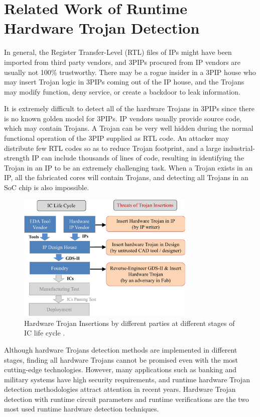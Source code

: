 \documentclass[10pt,journal]{IEEEtran}
\begin{document}
\section{Related Work of Runtime Hardware Trojan Detection}

In general, the Register Transfer-Level (RTL) files of IPs might have been imported from third party vendors, and 3PIPs procured from IP vendors are usually not 100\% trustworthy. There may be a rogue insider in a 3PIP house who may insert Trojan logic in 3PIPs coming out of the IP house, and the Trojans may modify function, deny service, or create a backdoor to leak information.%

It is extremely difficult to detect all of the hardware Trojans in 3PIPs since there is no known golden model for 3PIPs. IP vendors usually provide source code, which may contain Trojans. A Trojan can be very well hidden during the normal functional operation of the 3PIP supplied as RTL code. An attacker may distribute few RTL codes so as to reduce Trojan footprint, and a large industrial-strength IP can include thousands of lines of code, resulting in identifying the Trojan in an IP to be an extremely challenging task. When a Trojan exists in an IP, all the fabricated cores will contain Trojans, and detecting all Trojans in an SoC chip is also impossible.

\begin{figure}[!t]
\centering
\hspace*{-0.8em}
\includegraphics[width=8.5cm]{figure/HT_insert.pdf}
\caption{Hardware Trojan Insertions by different parties at different stages of IC life cycle \cite{article:SB2}.}
\label{fig:assign_result}
\end{figure}

Although hardware Trojans detection methods are implemented in different stages, finding all hardware Trojans cannot be promised even with the most cutting-edge technologies. However, many applications such as banking and military systems have high security requirements, and runtime hardware Trojan detection methodologies attract attention in recent years. Hardware Trojan detection with runtime circuit parameters and runtime verifications are the two most used runtime hardware detection techniques.
\end{document}

